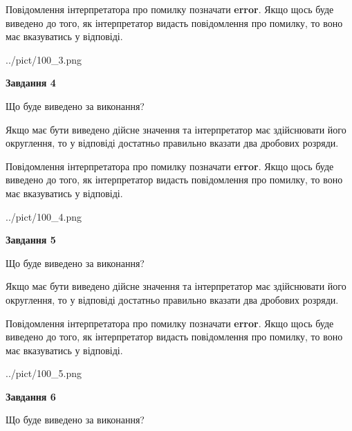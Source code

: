 \documentclass[12pt, ukrainian]{article}
\begin{document}
{\begin {Large}
Повідомлення інтерпретатора про помилку позначати \textbf{error}.
Якщо щось буде виведено до того, як інтерпретатор видасть повідомлення про помилку, 
то воно має вказуватись у відповіді. \par

\begin{center}
	{../pict/100_3.png}
\end{center}
\newpage

{\begin {center}\textbf{Завдання 4}\end {center}}\par
Що буде виведено за виконання? \par

Якщо має бути виведено дійсне значення та інтерпретатор має здійснювати його округлення, 
то у відповіді достатньо правильно вказати два дробових розряди.

Повідомлення інтерпретатора про помилку позначати \textbf{error}.
Якщо щось буде виведено до того, як інтерпретатор видасть повідомлення про помилку, 
то воно має вказуватись у відповіді. \par

\begin{center}
	{../pict/100_4.png}
\end{center}
\newpage

{\begin {center}\textbf{Завдання 5}\end {center}}\par
Що буде виведено за виконання? \par

Якщо має бути виведено дійсне значення та інтерпретатор має здійснювати його округлення, 
то у відповіді достатньо правильно вказати два дробових розряди.

Повідомлення інтерпретатора про помилку позначати \textbf{error}.
Якщо щось буде виведено до того, як інтерпретатор видасть повідомлення про помилку, 
то воно має вказуватись у відповіді. \par

\begin{center}
	{../pict/100_5.png}
\end{center}
\newpage

{\begin {center}\textbf{Завдання 6}\end {center}}\par
Що буде виведено за виконання? \par


\end{Large}}
\end{document}
